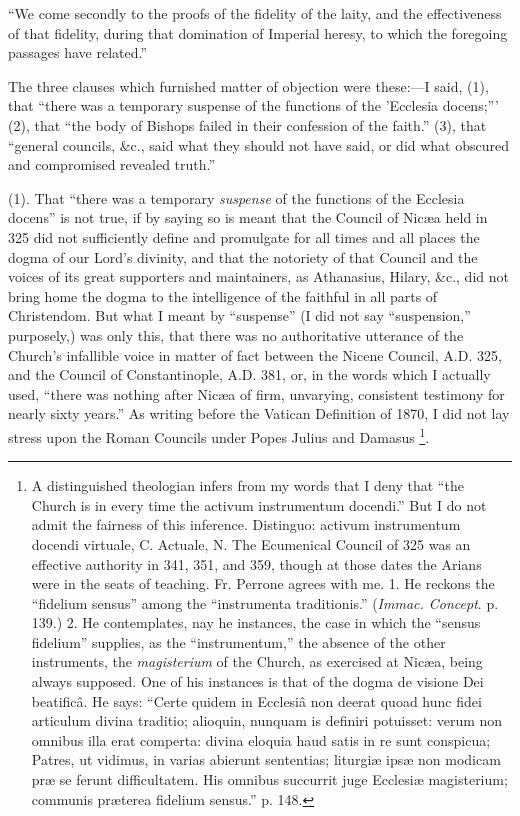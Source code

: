 ``We come secondly to the proofs of the fidelity of the laity,
and the effectiveness of that fidelity, during that domination of
Imperial heresy, to which the foregoing passages have related.''

The three clauses which furnished matter of objection were these:—I
said, (1), that ``there was a temporary suspense of the functions
of the 'Ecclesia docens;''' (2), that ``the body of Bishops
failed in their confession of the faith.'' (3), that ``general
councils, \&c., said what they should not have said, or did what
obscured and compromised revealed truth.''

(1). That ``there was a temporary \emph{suspense} of the
functions of the Ecclesia docens'' is not true, if by saying so is
meant that the Council of Nicæa held in 325 did not sufficiently
define and promulgate for all times and all places the dogma of our
Lord's divinity, and that the notoriety of that Council and the voices
of its great supporters and maintainers, as Athanasius, Hilary,
\&c., did not bring home the dogma to the intelligence of the
faithful in all parts of Christendom. But what I meant by
``suspense'' (I did not say ``suspension,''
purposely,) was only this, that there was no authoritative utterance
of the Church's infallible voice in matter of fact between the Nicene
Council, A.D. 325, and the Council of
Constantinople, A.D. 381, or, in the words which
I actually used, ``there was nothing after Nicæa of firm,
unvarying, consistent testimony for nearly sixty years.'' As
writing before the Vatican Definition of 1870, I did not lay stress
upon the Roman Councils under Popes Julius and Damasus \footnote{A distinguished theologian infers from my
words that I deny that ``the Church is in every time the activum
instrumentum docendi.'' But I do not admit the fairness of this
inference. Distinguo: activum instrumentum docendi virtuale, C.
Actuale, N. The Ecumenical Council of 325 was an effective authority
in 341, 351, and 359, though at those dates the Arians were in the
seats of teaching. Fr. Perrone agrees with me. 1. He reckons the
``fidelium sensus'' among the ``instrumenta traditionis.''
(\emph{Immac. Concept}. p. 139.) 2. He contemplates, nay he instances,
the case in which the ``sensus fidelium'' supplies, as the
``instrumentum,'' the absence of the other instruments, the \emph{magisterium}
of the Church, as exercised at Nicæa, being always supposed. One of
his instances is that of the dogma de visione Dei beatificâ. He says:
``Certe quidem in Ecclesiâ non deerat quoad hunc fidei articulum
divina traditio; alioquin, nunquam is definiri potuisset: verum non
omnibus illa erat comperta: divina eloquia haud satis in re sunt
conspicua; Patres, ut vidimus, in varias abierunt sententias;
liturgiæ ipsæ non modicam præ se ferunt difficultatem. His omnibus
succurrit juge Ecclesiæ magisterium; communis præterea fidelium
sensus.'' p. 148.}.

